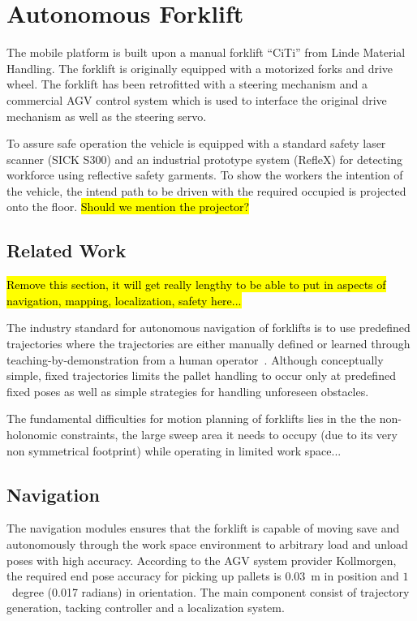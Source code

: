 \section{Autonomous Forklift}
\label{sec:agv}
%

The mobile platform is built upon a manual forklift ``CiTi'' from
Linde Material Handling. The forklift is originally equipped with a
motorized forks and drive wheel. The forklift has been retrofitted
with a steering mechanism and a commercial AGV control system which is
used to interface the original drive mechanism as well as the steering
servo.

To assure safe operation the vehicle is equipped with a standard safety
laser scanner (SICK S300) and an industrial prototype system (RefleX) for
detecting workforce using reflective safety garments. To show the workers the intention of the vehicle, the intend path to be driven with the required occupied is projected onto the floor. \hl{Should we mention the projector?}

%
\subsection{Related Work}
\label{subsec:AGV_related_work}

\hl{Remove this section, it will get really lengthy to be able to put in aspects of navigation, mapping, localization, safety here...}

The industry standard for autonomous navigation of forklifts is to use predefined
trajectories where the trajectories are either
manually defined or learned through teaching-by-demonstration from a human
operator~\cite{HellstromRingdahl.VAS06,MarshallEtAl.JFR08}.
Although conceptually simple, fixed trajectories limits the pallet handling to occur only at predefined fixed poses as well as simple strategies for handling unforeseen obstacles.

The fundamental difficulties for motion planning of forklifts lies in the the non-holonomic constraints, the large sweep area it needs to occupy (due to its very non symmetrical footprint) while operating in limited work space...


\subsection{Navigation}
\label{subsec:navigation}
%

The navigation modules ensures that the forklift is capable of moving save and autonomously through the work space environment to arbitrary load and unload poses with high accuracy. According to the AGV system provider Kollmorgen, the required end pose accuracy
for picking up pallets is $0.03$~m in position and $1$~degree (0.017 radians) in
orientation. The main component consist of trajectory generation, tacking controller and a localization system. 
 
